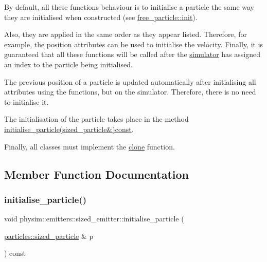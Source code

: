 By default, all these function\textquotesingle{}s behaviour is to initialise a particle the same way they are initialised when constructed (see \hyperlink{classphysim_1_1particles_1_1free__particle_a0df21e64a28c5fdf471d54a50b59fea3}{free\+\_\+particle\+::init}).

Also, they are applied in the same order as they appear listed. Therefore, for example, the position attributes can be used to initialise the velocity. Finally, it is guaranteed that all these functions will be called after the \hyperlink{classphysim_1_1simulator}{simulator} has assigned an index to the particle being initialised.

The previous position of a particle is updated automatically after initialising all attributes using the functions, but on the simulator. Therefore, there is no need to initialise it.

The initialisation of the particle takes place in the method \hyperlink{classphysim_1_1emitters_1_1sized__emitter_a94ce8e25bc26f8294659a89f5bc90cec}{initialise\+\_\+particle(sized\+\_\+particle\&)const}.

Finally, all classes must implement the \hyperlink{classphysim_1_1emitters_1_1sized__emitter_abc17295e37d7e39e54dc5253bae3d311}{clone} function. 

\subsection{Member Function Documentation}
\mbox{\label{classphysim_1_1emitters_1_1sized__emitter_a94ce8e25bc26f8294659a89f5bc90cec}} 
\subsubsection{\texorpdfstring{initialise\+\_\+particle()}{initialise\_particle()}}
{\footnotesize\ttfamily void physim\+::emitters\+::sized\+\_\+emitter\+::initialise\+\_\+particle (\begin{DoxyParamCaption}\item[{\hyperlink{classphysim_1_1particles_1_1sized__particle}{particles\+::sized\+\_\+particle} \&}]{p }\end{DoxyParamCaption}) const}



